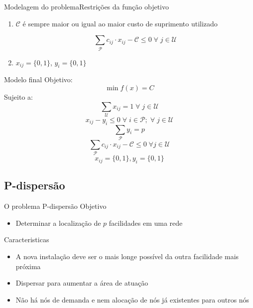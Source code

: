 \documentclass{beamer}
\newenvironment{outeritemize}{\begin{itemize}}{\end{itemize}\vspace{12pt}}
\begin{document}
\begin{frame}{Modelagem do problema}{Restrições da função objetivo}
    
    \begin{enumerate}
        \item $\mathcal{C}$ é sempre maior ou igual ao maior custo de suprimento utilizado

        \begin{equation*}
            \sum_{\mathcal{P}} c_{ij} \cdot x_{ij} - \mathcal{C} \leq 0
            \;\forall\;j \in \mathcal{U}
        \end{equation*} 

        \item $x_{ij} = \{0,1\}$, $y_i = \{0,1\}$
    \end{enumerate}
      
\end{frame}

\begin{frame}{Modelo final}
    Objetivo:
    $$\min f(x)= C$$
    Sujeito a:
    $$\sum_{\mathcal{U}} x_{ij} = 1 \;\forall\;j \in\mathcal{U}$$
    $$x_{ij} - y_i \leq 0 \;\forall\;i \in \mathcal{P};  \;\forall\;j \in \mathcal{U}$$
    $$\sum_{\mathcal{P}} y_{i} = p$$ 
    $$\sum_{\mathcal{P}} c_{ij} \cdot x_{ij} - \mathcal{C} \leq 0  \;\forall j \in \mathcal{U}$$
    $$x_{ij} = \{0,1\}, y_i = \{0,1\}$$
\end{frame}

\subsection{P-dispersão}

\begin{frame}{O problema P-dispersão}
Objetivo
\begin{outeritemize}
    \item Determinar a localização de $p$ facilidades em uma rede\\
\end{outeritemize} 

Caracteristicas
\begin{outeritemize}
    \item A nova instalação deve ser o mais longe possível da outra facilidade mais próxima 
    \item Dispersar para aumentar a área de atuação 
    \item Não há nós de demanda e nem alocação de nós já existentes para outros nós
\end{outeritemize}
\end{frame}
\end{document}
